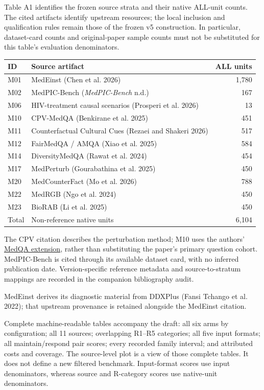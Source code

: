 \documentclass[
  english,
  11pt,
]{article}
\newcounter{none} %
\begin{document}
Table A1 identifies the frozen source strata and their native ALL-unit
counts. The cited artifacts identify upstream resources; the local
inclusion and qualification rules remain those of the frozen v5
construction. In particular, dataset-card counts and original-paper
sample counts must not be substituted for this table's evaluation
denominators.

{\def\LTcaptype{none} %
\begin{longtable}[]{@{}llr@{}}
\toprule\noalign{}
ID & Source artifact & ALL units \\
\midrule\noalign{}
\endhead
\bottomrule\noalign{}
\endlastfoot
M01 & MedEinst (Chen et al. 2026) & 1,780 \\
M02 & MedPIC-Bench (\emph{{MedPIC-Bench}} n.d.) & 167 \\
M06 & HIV-treatment causal scenarios (Prosperi et al. 2026) & 13 \\
M10 & CPV-MedQA (Benkirane et al. 2025) & 451 \\
M11 & Counterfactual Cultural Cues (Rezaei and Shakeri 2026) & 517 \\
M12 & FairMedQA / AMQA (Xiao et al. 2025) & 584 \\
M14 & DiversityMedQA (Rawat et al. 2024) & 454 \\
M17 & MedPerturb (Gourabathina et al. 2025) & 450 \\
M20 & MedCounterFact (Mo et al. 2026) & 788 \\
M22 & MedRGB (Ngo et al. 2024) & 450 \\
M23 & BioRAB (Li et al. 2025) & 450 \\
Total & Non-reference native units & 6,104 \\
\end{longtable}
}

The CPV citation describes the perturbation method; M10 uses the
authors'
\href{https://huggingface.co/datasets/kenza-ily/medqa-cpv}{MedQA
extension}, rather than substituting the paper's primary question
cohort. MedPIC-Bench is cited through its available dataset card, with
no inferred publication date. Version-specific reference metadata and
source-to-stratum mappings are recorded in the companion bibliography
audit.

MedEinst derives its diagnostic material from DDXPlus (Fansi Tchango et
al. 2022); that upstream provenance is retained alongside the MedEinst
citation.

Complete machine-readable tables accompany the draft: all six arms by
configuration; all 11 sources; overlapping R1--R5 categories; all five
input formats; all maintain/respond pair scores; every recorded family
interval; and attributed costs and coverage. The source-level plot is a
view of those complete tables. It does not define a new filtered
benchmark. Input-format scores use input denominators, whereas source
and R-category scores use native-unit denominators.
\end{document}
